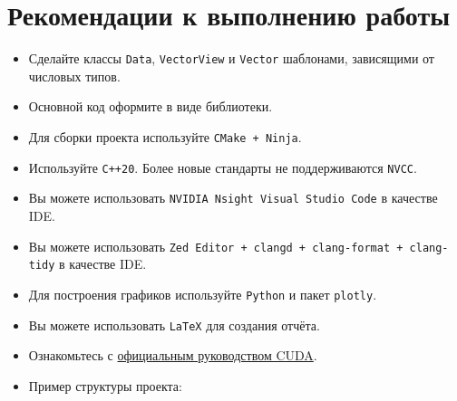 \documentclass[12pt]{article}
\begin{document}
\section*{Рекомендации к выполнению работы}
\begin{itemize}
    \item Сделайте классы \texttt{Data}, \texttt{VectorView} и \texttt{Vector} шаблонами, зависящими от числовых типов.
    \item Основной код оформите в виде библиотеки.
    \item Для сборки проекта используйте \texttt{CMake + Ninja}.
    \item Используйте \texttt{C++20}. Более новые стандарты не поддерживаются \texttt{NVCC}.
    \item Вы можете использовать \texttt{NVIDIA Nsight Visual Studio Code} в качестве IDE.
    \item Вы можете использовать \texttt{Zed Editor + clangd + clang-format + clang-tidy} в качестве IDE.
    \item Для построения графиков используйте \texttt{Python} и пакет \texttt{plotly}.
    \item Вы можете использовать \texttt{LaTeX} для создания отчёта.
    \item Ознакомьтесь с \href{https://docs.nvidia.com/cuda/cuda-c-programming-guide/#programming-model}{официальным руководством CUDA}.
    \item Пример структуры проекта:
\end{itemize}
\end{document}
